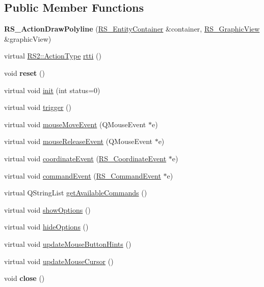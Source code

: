 \subsection*{Public Member Functions}
\begin{DoxyCompactItemize}
\item 
\hypertarget{classRS__ActionDrawPolyline_a52315e29b6ec0fd4cce4c192cd6c3c1b}{{\bfseries R\-S\-\_\-\-Action\-Draw\-Polyline} (\hyperlink{classRS__EntityContainer}{R\-S\-\_\-\-Entity\-Container} \&container, \hyperlink{classRS__GraphicView}{R\-S\-\_\-\-Graphic\-View} \&graphic\-View)}\label{classRS__ActionDrawPolyline_a52315e29b6ec0fd4cce4c192cd6c3c1b}

\item 
virtual \hyperlink{classRS2_afe3523e0bc41fd637b892321cfc4b9d7}{R\-S2\-::\-Action\-Type} \hyperlink{classRS__ActionDrawPolyline_afba5611105156c88f91e356e6c659c2c}{rtti} ()
\item 
\hypertarget{classRS__ActionDrawPolyline_ac268cfb60067bc2def8643af37024ec0}{void {\bfseries reset} ()}\label{classRS__ActionDrawPolyline_ac268cfb60067bc2def8643af37024ec0}

\item 
virtual void \hyperlink{classRS__ActionDrawPolyline_a2e698ba57d3e80a835c86b3de120737d}{init} (int status=0)
\item 
virtual void \hyperlink{classRS__ActionDrawPolyline_a54e86bb479bf7b5db099bffd6d789706}{trigger} ()
\item 
virtual void \hyperlink{classRS__ActionDrawPolyline_aed44fe50ae4cf75f75528de6e20679c2}{mouse\-Move\-Event} (Q\-Mouse\-Event $\ast$e)
\item 
virtual void \hyperlink{classRS__ActionDrawPolyline_a7dc607122a47cb490e74920f00b6e9ef}{mouse\-Release\-Event} (Q\-Mouse\-Event $\ast$e)
\item 
virtual void \hyperlink{classRS__ActionDrawPolyline_aeb229028e541e444f29e30cf2e43b786}{coordinate\-Event} (\hyperlink{classRS__CoordinateEvent}{R\-S\-\_\-\-Coordinate\-Event} $\ast$e)
\item 
virtual void \hyperlink{classRS__ActionDrawPolyline_a41df59a29a74a8bc8e6e96d2dd59c878}{command\-Event} (\hyperlink{classRS__CommandEvent}{R\-S\-\_\-\-Command\-Event} $\ast$e)
\item 
virtual Q\-String\-List \hyperlink{classRS__ActionDrawPolyline_a8890961ecbf79591700b17f3151bfff6}{get\-Available\-Commands} ()
\item 
virtual void \hyperlink{classRS__ActionDrawPolyline_a52dd80d2285b91981822fc7bb599f911}{show\-Options} ()
\item 
virtual void \hyperlink{classRS__ActionDrawPolyline_a0c2a10cb1e641f23f8678680874c95d8}{hide\-Options} ()
\item 
virtual void \hyperlink{classRS__ActionDrawPolyline_ac926827296200c604ddada31e432511c}{update\-Mouse\-Button\-Hints} ()
\item 
virtual void \hyperlink{classRS__ActionDrawPolyline_a9484312fe1867aa0bf17cbf011de86e2}{update\-Mouse\-Cursor} ()
\item 
\hypertarget{classRS__ActionDrawPolyline_ab802185d66b8a7415175e2efcdebd8ff}{void {\bfseries close} ()}\label{classRS__ActionDrawPolyline_ab802185d66b8a7415175e2efcdebd8ff}


\end{DoxyCompactItemize}
